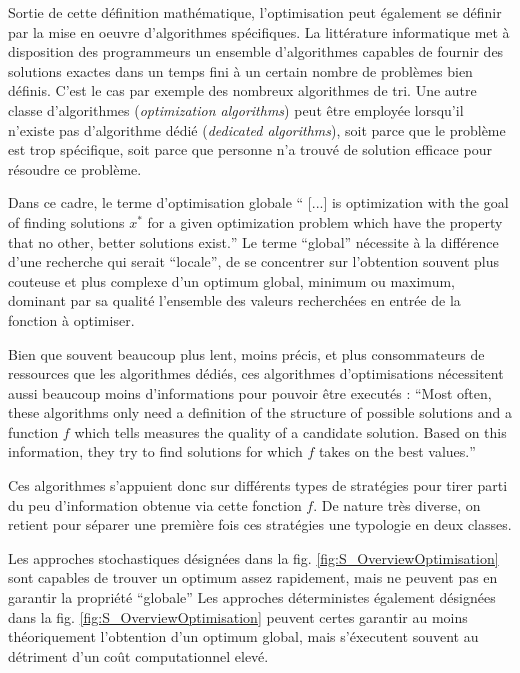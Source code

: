 Sortie de cette définition mathématique, l'optimisation peut également se définir par la mise en oeuvre d'algorithmes spécifiques. La littérature informatique met à disposition des programmeurs un ensemble d'algorithmes capables de fournir des solutions exactes dans un temps fini à un certain nombre de problèmes bien définis. C'est le cas par exemple des nombreux algorithmes de tri. Une autre classe d'algorithmes (\textit{optimization algorithms}) peut être employée lorsqu'il n'existe pas d'algorithme dédié (\textit{dedicated algorithms}), soit parce que le problème est trop spécifique, soit parce que personne n'a trouvé de solution efficace pour résoudre ce problème.

Dans ce cadre, le terme d'optimisation globale \foreignquote{english}{ [...] is optimization with the goal of finding solutions $x^*$ for a given optimization problem which have the property that no other, better solutions exist.} Le terme \enquote{global} nécessite à la différence d'une recherche qui serait \enquote{locale}, de se concentrer sur l'obtention souvent plus couteuse et plus complexe d'un optimum global, minimum ou maximum, dominant par sa qualité l'ensemble des valeurs recherchées en entrée de la fonction à optimiser.

Bien que souvent beaucoup plus lent, moins précis, et plus consommateurs de ressources que les algorithmes dédiés, ces algorithmes d'optimisations nécessitent aussi beaucoup moins d'informations pour pouvoir être executés : \foreignquote{english}{Most often, these algorithms only need a definition of the structure of possible solutions and a function $f$ which tells measures the quality of a candidate solution. Based on this information, they try to find solutions for which $f$ takes on the best values.} \autocite[24]{Weise2011}

Ces algorithmes s'appuient donc sur différents types de stratégies pour tirer parti du peu d'information obtenue via cette fonction $f$. De nature très diverse, on retient pour séparer une première fois ces stratégies une typologie en deux classes.

\begin{itemize}[label=\textbullet]
 Les approches stochastiques désignées dans la fig. \ref{fig:S_OverviewOptimisation} sont capables de trouver un optimum assez rapidement, mais ne peuvent pas en garantir la propriété \enquote{globale}
 Les approches déterministes également désignées dans la fig. \ref{fig:S_OverviewOptimisation} peuvent certes garantir au moins théoriquement l'obtention d'un optimum global, mais s'éxecutent souvent au détriment d'un coût computationnel elevé.
\end{itemize}

